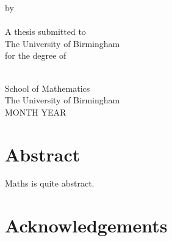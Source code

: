 \documentclass[a4paper, 12pt, oneside]{report}
\theoremstyle{nonumberplain}
\begin{document}
\doublespacing





\begin{titlepage}

	\vspace*{0.1in}
	\begin{singlespace}
		\begin{center}
			\begin{doublespace}
			{\Huge{}}
			\end{doublespace}
			\vspace{0.5in}
			by\\
			\vspace{0.5in}
			{\Large{}}\\
			\vspace{1.5in}
			A thesis submitted to\\
			The University of Birmingham\\
			for the degree of\\
			{}\\
		\end{center}

		\vfill

		\hfill
		\parbox{2.8in}{School of Mathematics\\
			The University of Birmingham\\
			MONTH YEAR}
	\end{singlespace}

\end{titlepage}



\chapter*{Abstract}

Maths is quite abstract.

\thispagestyle{empty}



\chapter*{Acknowledgements}
\end{document}
